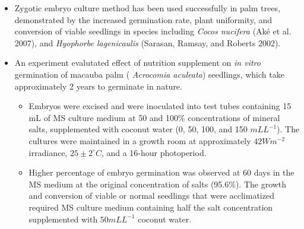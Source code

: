 \documentclass[
  ignorenonframetext,
  aspectratio=169]{beamer}
\providecommand{\tightlist}{%
  \setlength{\itemsep}{0pt}\setlength{\parskip}{0pt}}
\begin{document}
\begin{frame}{}
\protect\hypertarget{section-5}{}
\footnotesize

\begin{itemize}
\tightlist
\item
  Zygotic embryo culture method has been used successfully in palm
  trees, demonstrated by the increased germination rate, plant
  uniformity, and conversion of viable seedlings in species including
  \emph{Cocos nucifera} (Aké et al. 2007), and \emph{Hyophorbe
  lagenicaulis} (Sarasan, Ramsay, and Roberts 2002).
\item
  An experiment evalutated effect of nutrition supplement on \emph{in
  vitro} germination of macauba palm ( \emph{Acrocomia aculeata})
  seedlings, which take approximately 2 years to germinate in nature.

  \begin{itemize}
  \tightlist
  \item
    Embryos were excised and were inoculated into test tubes containing
    15 mL of MS culture medium at 50 and 100\% concentrations of mineral
    salts, supplemented with coconut water (0, 50, 100, and 150
    \(mL L^{-1}\)). The cultures were maintained in a growth room at
    approximately \(42 W m^{-2}\) irradiance, \(25\pm 2^\circ C\), and a
    16-hour photoperiod.
  \item
    Higher percentage of embryo germination was observed at 60 days in
    the MS medium at the original concentration of salts (95.6\%). The
    growth and conversion of viable or normal seedlings that were
    acclimatized required MS culture medium containing half the salt
    concentration supplemented with \(50 mL L^{-1}\) coconut water.
  \end{itemize}
\end{itemize}
\end{frame}
\end{document}
